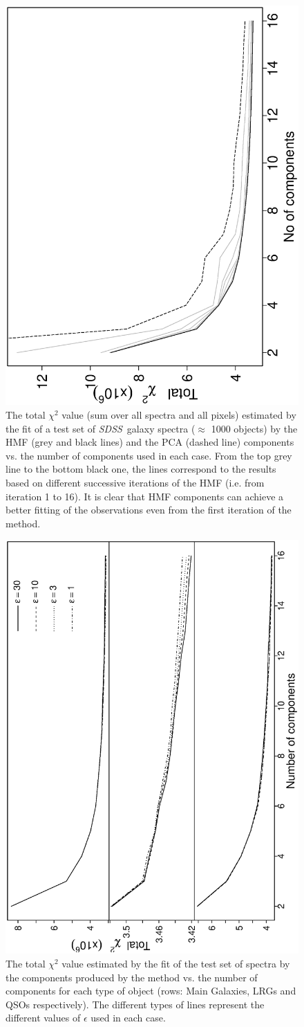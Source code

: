 \documentclass[12pt,preprint]{aastex}
\newcommand{\project}[1]{\textsl{#1}}
\newcommand{\sdss}{\project{SDSS}}
\newcommand{\SDSS}{\sdss}
\begin{document}
\clearpage
\begin{figure}
\includegraphics[angle=-90,width=0.49\columnwidth]{paper_plots/proposal1}
\caption{The total $\chi^2$ value (sum over all spectra and all pixels) estimated by the fit of a test set of \SDSS\ galaxy spectra ($\approx$ 1000 objects) by the HMF (grey and black lines) and the PCA (dashed line) components vs. the number of components used in each case. From the top grey line to the bottom black one, the lines correspond to the results based on different successive iterations of the HMF (i.e. from iteration 1 to 16). It is clear that HMF components can achieve a better fitting of the observations even from the first iteration of the method.}
\label{fig:2b}
\end{figure}

\clearpage
\begin{figure}
\includegraphics[angle=-90,width=0.49\columnwidth]{paper_plots/fig5}
\caption{The total $\chi^2$ value estimated by the fit of the test set
  of spectra by the components produced by the method vs. the number
  of components for each type of object (rows: Main Galaxies, LRGs and QSOs
  respectively). The different types of lines represent the different
  values of $\epsilon$ used in each case.}
\label{fig:3}
\end{figure}
\end{document}

